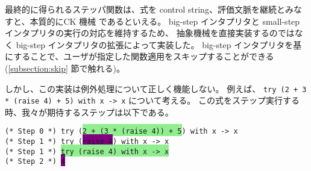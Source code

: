 最終的に得られるステッパ関数は、式を control string、評価文脈を継続とみなすと、本質的にCK 機械 \cite{FF1986} であるといえる。
big-step インタプリタと small-step インタプリタの実行の対応を維持するため、
抽象機械を直接実装するのではなく big-step インタプリタの拡張によって実装した。
big-step インタプリタを基にすることで、ユーザが指定した関数適用をスキップすることができる
(\ref{subsection:skip} 節で触れる)。

しかし、この実装は例外処理について正しく機能しない。
例えば、 \texttt{try (2 + 3 * (raise 4) + 5) with x -> x} について考える。
この式をステップ実行する時、我々が期待するステップは以下である。

\vspace{0.2cm}

\noindent \texttt{(* Step 0 *) try (\colorbox{lightgreen}{2 + (3 * (raise 4)) + 5}) with x -> x\\
  (* Step 1 *) try (\colorbox{purple}{raise 4}) with x -> x\\
  (* Step 1 *) \colorbox{lightgreen}{try (raise 4) with x -> x}\\
  (* Step 2 *) \colorbox{purple}{4}\\
}

\vspace{0.2cm}

